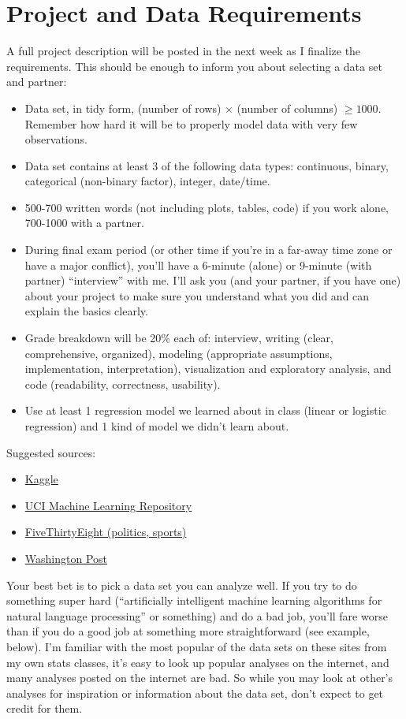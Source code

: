 \documentclass[12pt]{article}
\begin{document}
\section*{Project and Data Requirements}

A full project description will be posted in the next week as I finalize the requirements. This should be enough to inform you about selecting a data set and partner:
\begin{itemize}
	\item Data set, in tidy form, (number of rows) $\times$ (number of columns) $\ge 1000$. Remember how hard it will be to properly model data with very few observations.
	\item Data set contains at least 3 of the following data types: continuous, binary, categorical (non-binary factor), integer, date/time.
	\item 500-700 written words (not including plots, tables, code) if you work alone, 700-1000 with a partner.
	\item During final exam period (or other time if you're in a far-away time zone or have a major conflict), you'll have a 6-minute (alone) or 9-minute (with partner) ``interview'' with me. I'll ask you (and your partner, if you have one) about your project to make sure you understand what you did and can explain the basics clearly.
	\item Grade breakdown will be 20\% each of: interview, writing (clear, comprehensive, organized), modeling (appropriate assumptions, implementation, interpretation), visualization and exploratory analysis, and code (readability, correctness, usability).
	\item Use at least 1 regression model we learned about in class (linear or logistic regression) and 1 kind of model we didn't learn about.
\end{itemize}

Suggested sources:
\begin{itemize}
	\item \href{https://www.kaggle.com/datasets}{Kaggle}
	\item \href{https://archive.ics.uci.edu/ml/index.php}{UCI Machine Learning Repository}
	\item \href{https://github.com/fivethirtyeight/data}{FiveThirtyEight (politics, sports)}
	\item \href{https://github.com/washingtonpost}{Washington Post}
\end{itemize}
Your best bet is to pick a data set you can analyze well. If you try to do something super hard (``artificially intelligent machine learning algorithms for natural language processing'' or something) and do a bad job, you'll fare worse than if you do a good job at something more straightforward (see example, below). I'm familiar with the most popular of the data sets on these sites from my own stats classes, it's easy to look up popular analyses on the internet, and many analyses posted on the internet are bad. So while you may look at other's analyses for inspiration or information about the data set, don't expect to get credit for them.
\end{document}
